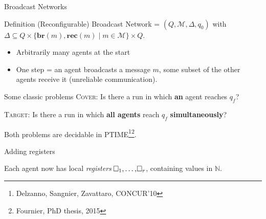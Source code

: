 \documentclass{beamer}
\newcommand{\messages}{\mathcal{M}}
\newcommand{\reg}{\hspace{-0.5mm}\square}
\newcommand{\COVER}{\textsc{Cover}\xspace}
\newcommand{\TARGET}{\textsc{Target}\xspace}
\begin{document}
\begin{frame}{Broadcast Networks}
	\begin{block}{Definition\footnotemark}
		(Reconfigurable) Broadcast Network = $(Q, \messages, \Delta, q_0)$ with $\Delta \subseteq Q\times \{\mathbf{br}(m), \mathbf{rec}(m) \mid m \in \messages\} \times Q$.
	\end{block}
	
	\pause
	
	\begin{itemize}
		\item Arbitrarily many agents at the start
		\item One step = an agent broadcasts a message $m$, some subset of the other agents receive it (unreliable communication).
	\end{itemize}
	
	\pause 
	
	\begin{block}{Some classic problems}
		{\COVER}: Is there a run in which \textbf{an} agent reaches $q_f$?
		
		{\TARGET}: Is there a run in which \textbf{all agents} reach $q_f$ \textbf{simultaneously}?
	\end{block}
	
	Both problems are decidable in PTIME\footnote[1]{Delzanno, Sangnier, Zavattaro, CONCUR'10}\footnote<3>{Fournier, PhD thesis, 2015}.
\end{frame}

\begin{frame}{Adding registers}
	
	Each agent now has local \emph{registers} $\reg_1, \ldots, \reg_r$, containing values in $\mathbb{N}$.\vspace{0.3cm}\pause
	\begin{center}
	
	\end{center}
\end{frame}
\end{document}
